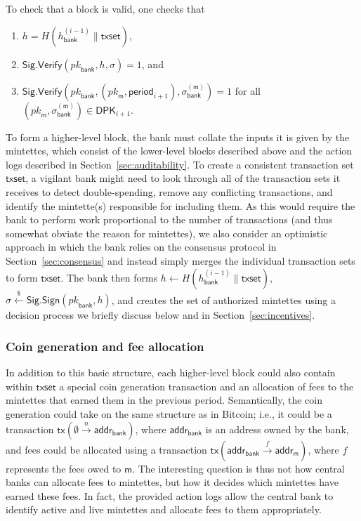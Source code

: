 \documentclass[conference]{IEEEtran}
\newcommand\ben{\begin{enumerate}}
\newcommand\een{\end{enumerate}}
\newcommand{\randpick}{\xleftarrow{\$}}
\newcommand{\pk}{{\ensuremath{pk}}}
\newcommand{\sig}{{\ensuremath{\sigma}}}
\newcommand{\sigsign}{\mathsf{Sig.Sign}}
\newcommand{\sigverify}{\mathsf{Sig.Verify}}
\newcommand{\addr}{\mathsf{addr}}
\newcommand{\period}{\mathsf{period}}
\newcommand{\txspec}[3]{\mathsf{tx}({#1}\xrightarrow{{#2}}{#3})}
\newcommand{\bank}{\mathsf{bank}}
\newcommand{\mintette}{\mathsf{m}}
\newcommand{\txset}{\mathsf{txset}}
\newcommand{\periodmintette}[1]{\mathsf{DPK}_{{#1}}}
\newcommand{\mintettesig}{\sig_\bank^{(\mintette)}}
\begin{document}
To check that a block is valid, one checks that
\ben
\item $h = H(h_{\bank}^{(i-1)}\|\txset)$,
\item $\sigverify(\pk_\bank,h,\sig)=1$, and
\item $\sigverify(\pk_\bank,(\pk_\mintette,\period_{i+1}),\mintettesig)=1$ for
all $(\pk_\mintette,\mintettesig)\in\periodmintette{i+1}$.
\een

To form a higher-level block, the bank must collate the inputs it is given by
the mintettes, which consist of the lower-level blocks described above and the
action logs described in Section~\ref{sec:auditability}.  To create a
consistent transaction set $\txset$, a vigilant bank might need to look
through all of the transaction sets it receives to detect double-spending,
remove any conflicting transactions, and identify the mintette(s) responsible
for including them.  As this would require the bank to perform work
proportional
to the number of transactions (and thus somewhat obviate the reason for
mintettes), we
also consider an optimistic approach in which the bank relies on the consensus
protocol in Section~\ref{sec:consensus} and instead simply merges the
individual transaction sets to form $\txset$.  The bank then forms $h\gets
H(h_{\bank}^{(i-1)}\|\txset)$, $\sig\randpick\sigsign(\pk_\bank,h)$, and
creates the set of
authorized mintettes using a decision process we briefly discuss below and in
Section~\ref{sec:incentives}.

\subsubsection{Coin generation and fee allocation}\label{sec:role-bank}

In addition to this basic structure, each higher-level block could also
contain within $\txset$ a special coin generation transaction and an
allocation
of fees to the mintettes that earned them in the previous period.
Semantically, the coin generation could take on the same structure as in
Bitcoin; i.e., it could be a transaction $\txspec{\emptyset}{n}{\addr_\bank}$,
where $\addr_\bank$ is an address owned by the bank, and fees could be
allocated using a transaction $\txspec{\addr_\bank}{f}{\addr_\mintette}$,
where
$f$ represents the fees owed to $\mintette$.
The interesting question is thus not how central banks can allocate fees to
mintettes, but how it decides which mintettes have earned these fees.  In
fact, the provided action logs allow the central bank to identify active and
live mintettes and allocate fees to them appropriately.
\end{document}
